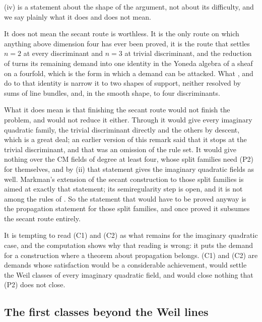 \begin{remark}\label{rem:secantplace}
(iv) is a statement about the shape of the argument, not
about its difficulty, and we say plainly what it does and does not
mean.

It does not mean the secant route is worthless. It is the only route on which
anything above dimension four has ever been proved, it is the route that
settles $n=2$ at every discriminant and $n=3$ at trivial discriminant, and the
reduction of
 turns its remaining demand into one identity in the Yoneda
algebra of a sheaf on a fourfold, which is the form in which a demand can be
attacked. What ,  and
 do to that identity is narrow it to two shapes of
support, neither resolved by sums of line bundles, and, in the smooth shape,
to four discriminants.

What it does mean is that finishing the secant route would not finish the
problem, and would not reduce it either. Through  it would
give every imaginary quadratic family, the trivial discriminant directly and
the others by descent, which is a great deal; an earlier version of this
remark said that it stops at the trivial discriminant, and that was an
omission of the rule set. It would give nothing over the CM fields of degree
at least four, whose split families need (P2) for themselves, and by
(ii) that statement gives the imaginary quadratic fields as
well. Markman's extension of the secant construction to those split families
\cite{Mar25c} is aimed at exactly that statement; its semiregularity step is
open, and it is not among the rules of . So the statement that would have to be proved anyway is the
propagation statement for those split families, and once proved it subsumes
the secant route entirely.

It is tempting to read (C1) and (C2) as what remains for the imaginary
quadratic case, and the computation shows why that reading is wrong: it puts
the demand for a construction where a theorem about propagation belongs.
(C1) and (C2) are demands whose satisfaction would be a considerable
achievement, would settle the Weil classes of every imaginary quadratic field,
and would close nothing that (P2) does not close.
\end{remark}

\subsection{The first classes beyond the Weil lines}\label{ssec:mumford}

